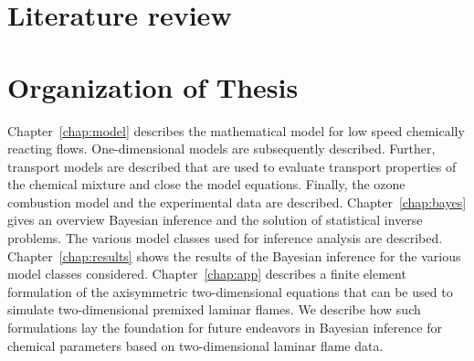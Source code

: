 \section{Literature review}



\section{Organization of Thesis}
\bigskip

Chapter~\ref{chap:model} describes the mathematical model for low speed
chemically reacting flows. One-dimensional models are subsequently described.
Further, transport models are described that are used to evaluate
transport properties of the chemical mixture and close the model equations.
Finally, the ozone combustion model and the experimental data are
described.
Chapter~\ref{chap:bayes} gives an overview
Bayesian inference and the solution of statistical inverse problems.
The various model classes used for inference
analysis are described.
Chapter~\ref{chap:results} shows the results of the Bayesian inference
for the various model classes considered.
Chapter~\ref{chap:app} describes a finite element formulation of the
axisymmetric two-dimensional equations that can be used to simulate
two-dimensional premixed laminar flames. We describe how such formulations lay the foundation for future
endeavors in Bayesian inference for chemical parameters based on
two-dimensional laminar flame data.
